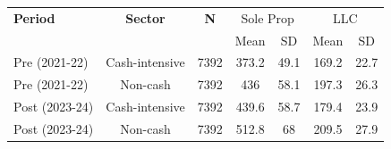 \begin{tabular}{lcccccc}
\toprule
\textbf{Period} & \textbf{Sector} & \textbf{N} & \multicolumn{2}{c}{Sole Prop} & \multicolumn{2}{c}{LLC} \\
 & & & Mean & SD & Mean & SD \\
\midrule
Pre (2021-22) & Cash-intensive & 7392 & 373.2 & 49.1 & 169.2 & 22.7 \\
Pre (2021-22) & Non-cash & 7392 & 436 & 58.1 & 197.3 & 26.3 \\
Post (2023-24) & Cash-intensive & 7392 & 439.6 & 58.7 & 179.4 & 23.9 \\
Post (2023-24) & Non-cash & 7392 & 512.8 & 68 & 209.5 & 27.9 \\
\bottomrule
\end{tabular}
